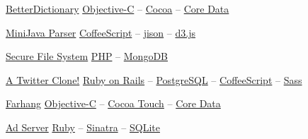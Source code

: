 \documentclass{tccv}
\begin{document}
{{\begin{project_list}
\end{project_list}

\begin{oneline_projects}

\item{\href{http://pooriaazimi.github.io/BetterDictionary/}{BetterDictionary}}
	 {%
	 	\href{https://en.wikipedia.org/wiki/Objective-C}{Objective-C} -- 
		\href{https://en.wikipedia.org/wiki/Cocoa_(API)}{Cocoa} -- 
		\href{https://en.wikipedia.org/wiki/Core_Data}{Core Data}%
	 }	

\item{\href{https://github.com/pooriaazimi/Mini-Java}{MiniJava Parser}}
	 {%
		 \href{http://coffeescript.org}{CoffeeScript} -- 
		 \href{http://zaach.github.io/jison/}{jison} -- 
		 \href{http://d3js.org}{d3.js}%
	 }

\item{\href{https://github.com/pooriaazimi/secure_file_system}{Secure File System}}
	 {%
		 \href{http://php.net}{PHP} -- 
		 \href{http://www.mongodb.org}{MongoDB}%
	 }

\item{\href{https://github.com/pooriaazimi/twitter}{A Twitter Clone!}}
	 {%
		 \href{http://rubyonrails.org}{Ruby on Rails} -- 
		 \href{http://www.postgresql.org}{PostgreSQL} -- 
		 \href{http://coffeescript.org}{CoffeeScript} -- 
		 \href{http://sass-lang.com}{Sass}%
	 }


\item{\href{http://www.turnedondigital.com/?portfolio=farhang-iphone-app}{Farhang}}
	 {%
	 	\href{https://en.wikipedia.org/wiki/Objective-C}{Objective-C} -- 
		\href{https://en.wikipedia.org/wiki/Cocoa_Touch}{Cocoa Touch} -- 
		\href{https://en.wikipedia.org/wiki/Core_Data}{Core Data}%
	 }

\item{\href{https://github.com/pooriaazimi/adserver}{Ad Server}}
	 {%
	 	\href{https://www.ruby-lang.org/en/}{Ruby} -- 
		\href{http://www.sinatrarb.com}{Sinatra} -- 
		\href{http://www.sqlite.org}{SQLite}%
	 }


\end{oneline_projects}








\vspace{-30pt}














}}
\end{document}
